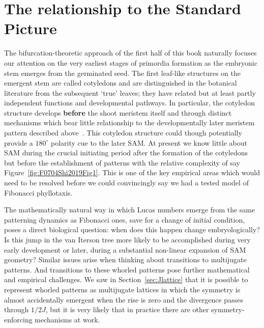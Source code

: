 \section{The relationship to the Standard Picture}
\label{sec:jugacy}
The bifurcation-theoretic approach of the first half of this book naturally focuses our attention on the very earliest stages of primordia formation as the embryonic stem emerges from the germinated seed.  The first leaf-like structures on the emergent stem are called cotyledons and are distinguished in the botanical literature from the subsequent `true' leaves; they have related but at least partly independent functions and developmental pathways. In particular, the cotyledon structure develops \textbf{before} the shoot meristem itself and through distinct mechanisms which bear little relationship to the developmentally later meristem pattern described above~\autocite{yoshidaGeneticControlPlant2014}. This cotyledon structure could though potentially provide a $180^\circ$ polarity cue to the later SAM. At present we know  little about SAM during the crucial initiating period after the formation of the cotyledons but before the establishment of patterns with the relative complexity of say Figure~\ref{fig:F0704Shi2019Fig1}. This is one of the key empirical areas which would need to be resolved before we could convincingly say we had a tested model of Fibonacci phyllotaxis. 

The mathematically natural way in which Lucas numbers emerge from the same patterning dynamics as Fibonacci ones, save for a change of initial condition, poses a direct biological question: when does this happen change embryologically?  Is this jump in the van Iterson tree more likely to be accomplished during very early development or later, during a substantial non-linear expansion of SAM geometry? Similar issues arise when thinking about transitions to multijugate patterns. And transitions to these whorled patterns pose further mathematical and empirical challenges. We saw in Section~\ref{sec:Jlattice} that it is possible to represent whorled patterns as multijugate lattices in which the symmetry is almost accidentally emergent when the  rise is zero and the divergence passes through $1/2J$, but it is very likely that in practice there are other symmetry-enforcing mechanisms at work. 



